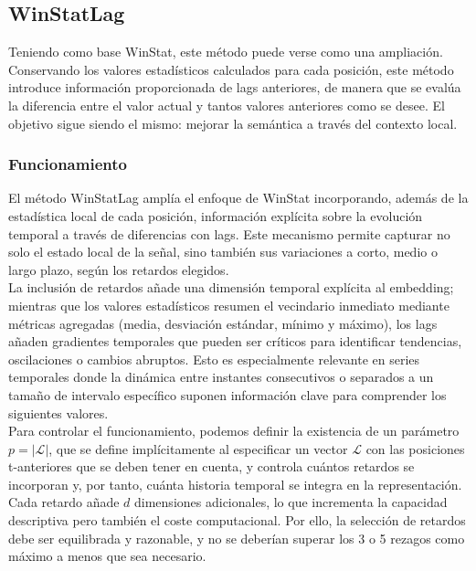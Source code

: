 \subsection{WinStatLag}

Teniendo como base WinStat, este método puede verse como una ampliación. Conservando los valores estadísticos calculados para cada posición, este método introduce información proporcionada de lags anteriores, de manera que se evalúa la diferencia entre el valor actual y tantos valores anteriores como se desee. El objetivo sigue siendo el mismo: mejorar la semántica a través del contexto local.

\subsubsection{Funcionamiento}

El método WinStatLag amplía el enfoque de WinStat incorporando, además de la estadística local de cada posición, información explícita sobre la evolución temporal a través de diferencias con lags. Este mecanismo permite capturar no solo el estado local de la señal, sino también sus variaciones a corto, medio o largo plazo, según los retardos elegidos.\\

La inclusión de retardos añade una dimensión temporal explícita al embedding; mientras que los valores estadísticos resumen el vecindario inmediato mediante métricas agregadas (media, desviación estándar, mínimo y máximo), los lags añaden gradientes temporales que pueden ser críticos para identificar tendencias, oscilaciones o cambios abruptos. Esto es especialmente relevante en series temporales donde la dinámica entre instantes consecutivos  o separados a un tamaño de intervalo específico suponen información clave para comprender los siguientes valores.\\

Para controlar el funcionamiento, podemos definir la existencia de un parámetro $p = |\mathcal{L}|$, que se define implícitamente al especificar un vector $\mathcal{L}$ con las posiciones t-anteriores que se deben tener en cuenta, y controla cuántos retardos se incorporan y, por tanto, cuánta historia temporal se integra en la representación. Cada retardo añade $d$ dimensiones adicionales, lo que incrementa la capacidad descriptiva pero también el coste computacional. Por ello, la selección de retardos debe ser equilibrada y razonable, y no se deberían superar los 3 o 5 rezagos como máximo a menos que sea necesario.\\

